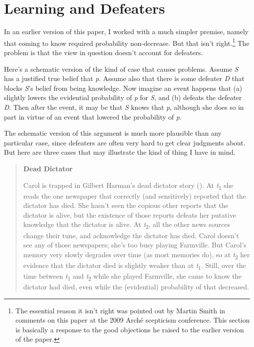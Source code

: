 \documentclass[
  11pt,
  letterpaper,
  DIV=11,
  numbers=noendperiod,
  twoside]{scrartcl}
\begin{document}
\section{Learning and Defeaters}\label{learning-and-defeaters}

In an earlier version of this paper, I worked with a much simpler
premise, namely that coming to know required probability non-decrease.
But that isn't right.\footnote{The essential reason it isn't right was
  pointed out by Martin Smith in comments on this paper at the 2009
  Arché scepticism conference. This section is basically a response to
  the good objections he raised to the earlier version of the paper.}
The problem is that the view in question doesn't account for defeaters.

Here's a schematic version of the kind of case that causes problems.
Assume \emph{S} has a justified true belief that \emph{p}. Assume also
that there is some defeater \emph{D} that blocks \emph{S}'s belief from
being knowledge. Now imagine an event happens that (a) slightly lowers
the evidential probability of \emph{p} for \emph{S}, and (b) defeats the
defeater \emph{D}. Then after the event, it may be that \emph{S} knows
that \emph{p}, although she does so in part in virtue of an event that
lowered the probability of \emph{p}.

The schematic version of this argument is much more plausible than any
particular case, since defeaters are often very hard to get clear
judgments about. But here are three cases that may illustrate the kind
of thing I have in mind.

\begin{quote}
\textbf{Dead Dictator}

Carol is trapped in Gilbert Harman's dead dictator story
(). At
\emph{t}\textsubscript{1} she reads the one newspaper that correctly
(and sensitively) reported that the dictator has died. She hasn't seen
the copious other reports that the dictator is alive, but the existence
of those reports defeats her putative knowledge that the dictator is
alive. At \emph{t}\textsubscript{2}, all the other news sources change
their tune, and acknowledge the dictator has died. Carol doesn't see any
of those newspapers; she's too busy playing Farmville. But Carol's
memory very slowly degrades over time (as most memories do), so at
\emph{t}\textsubscript{2} her evidence that the dictator died is
slightly weaker than at \emph{t}\textsubscript{1}. Still, over the time
between \emph{t}\textsubscript{1} and \emph{t}\textsubscript{2} while
she played Farmville, she came to know the dictator had died, even while
the (evidential) probability of that decreased.
\end{quote}
\end{document}
